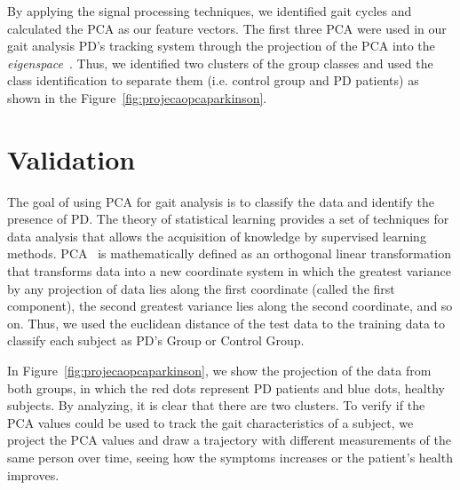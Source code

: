 \documentclass[10pt, conference, compsocconf]{IEEEtran}
\begin{document}
By applying the signal processing techniques, we identified gait cycles and calculated the PCA as our feature vectors. The first three PCA were used in our gait analysis PD's tracking system through the projection of the PCA into the \textit{eigenspace}~\cite{Shlens05atutorial}. Thus, we identified two clusters of the group classes and used the class identification to separate them (i.e. control group and PD patients) as shown in the Figure~\ref{fig:projecaopcaparkinson}. 


%



\section{Validation}\label{sec:results}


The goal of using PCA for gait analysis is to classify the data and identify the presence of PD. The theory of statistical learning provides a set of techniques for data analysis that allows the acquisition of knowledge by supervised learning methods. PCA~\cite{Shlens05atutorial} is mathematically defined as an orthogonal linear transformation that transforms data into a new coordinate system in which the greatest variance by any projection of data lies along the first coordinate (called the first component), the second greatest variance lies along the second coordinate, and so on. Thus, we used the euclidean distance of the test data to the training data to classify each subject as PD's Group or Control Group. 

In Figure~\ref{fig:projecaopcaparkinson},  we show the projection of the data from both groups, in which the red dots represent PD patients and blue dots, healthy subjects. By analyzing, it is clear that there are two clusters. To verify if the PCA values could be used to track the gait characteristics of a subject, we project the PCA values and draw a trajectory with different measurements of the same person over time, seeing how the symptoms increases or the patient's health improves.
\end{document}
